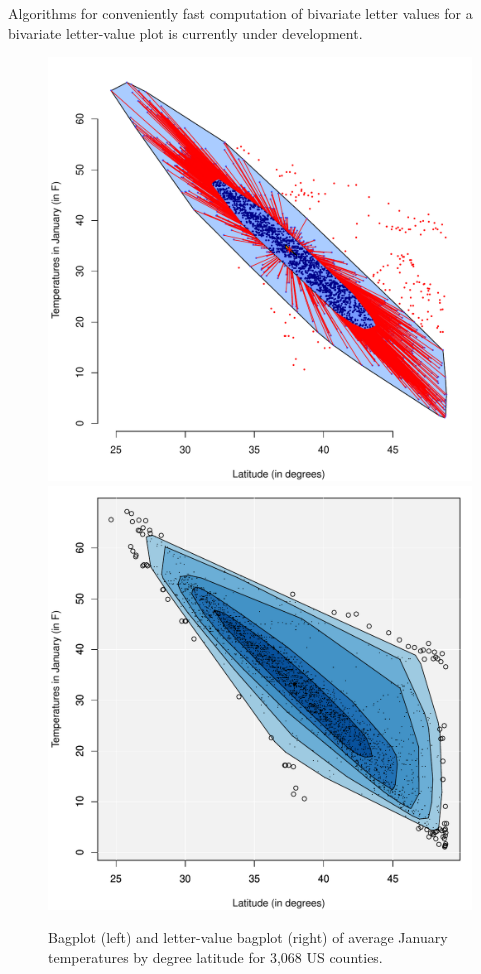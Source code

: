 \documentclass[oneside]{article}
\begin{document}
Algorithms for conveniently fast computation of bivariate letter values for a bivariate letter-value plot is currently under development.

\begin{figure}[hbtp]
  \centering
   \includegraphics[scale=0.45]{images/counties-bag}
   \includegraphics[scale=0.45]{images/counties-lvbag}
  \caption{Bagplot (left) and letter-value bagplot (right) of average January temperatures by degree latitude for 3,068 US counties. }
  \label{counties-bag} 
\end{figure}
\end{document}
